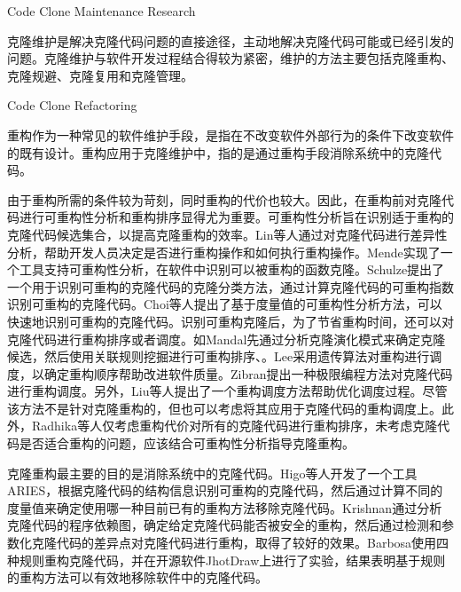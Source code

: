 {Code Clone Maintenance Research}

克隆维护是解决克隆代码问题的直接途径，主动地解决克隆代码可能或已经引发的问题。克隆维护与软件开发过程结合得较为紧密，维护的方法主要包括克隆重构、克隆规避、克隆复用和克隆管理。

{Code Clone Refactoring}

重构作为一种常见的软件维护手段，是指在不改变软件外部行为的条件下改变软件的既有设计\cite{kerievsky2006重构与模式}。重构应用于克隆维护中，指的是通过重构手段消除系统中的克隆代码。

由于重构所需的条件较为苛刻，同时重构的代价也较大。因此，在重构前对克隆代码进行可重构性分析和重构排序显得尤为重要。可重构性分析旨在识别适于重构的克隆代码候选集合，以提高克隆重构的效率。Lin等人通过对克隆代码进行差异性分析，帮助开发人员决定是否进行重构操作和如何执行重构操作\cite{lin2014detecting}。Mende实现了一个工具支持可重构性分析，在软件中识别可以被重构的函数克隆\cite{mende2009evaluation}。Schulze提出了一个用于识别可重构的克隆代码的克隆分类方法，通过计算克隆代码的可重构指数识别可重构的克隆代码\cite{schulze2008towards}。Choi等人提出了基于度量值的可重构性分析方法，可以快速地识别可重构的克隆代码\cite{choi2011extracting}。识别可重构克隆后，为了节省重构时间，还可以对克隆代码进行重构排序或者调度。如Mandal先通过分析克隆演化模式来确定克隆候选，然后使用关联规则挖掘进行可重构排序、\cite{mandal2014automatic}。Lee采用遗传算法对重构进行调度，以确定重构顺序帮助改进软件质量\cite{lee2011automated}。Zibran提出一种极限编程方法对克隆代码进行重构调度\cite{zibran2011constraint}。另外，Liu等人提出了一个重构调度方法帮助优化调度过程\cite{liu2012schedule}。尽管该方法不是针对克隆重构的，但也可以考虑将其应用于克隆代码的重构调度上。此外，Radhika等人仅考虑重构代价对所有的克隆代码进行重构排序，未考虑克隆代码是否适合重构的问题\cite{venkatasubramanyam2013prioritizing}，应该结合可重构性分析指导克隆重构。

克隆重构最主要的目的是消除系统中的克隆代码。Higo等人开发了一个工具ARIES，根据克隆代码的结构信息识别可重构的克隆代码，然后通过计算不同的度量值来确定使用哪一种目前已有的重构方法移除克隆代码\cite{higo2008metric}。Krishnan通过分析克隆代码的程序依赖图，确定给定克隆代码能否被安全的重构，然后通过检测和参数化克隆代码的差异点对克隆代码进行重构，取得了较好的效果\cite{krishnan2014unification}。Barbosa使用四种规则重构克隆代码，并在开源软件JhotDraw上进行了实验，结果表明基于规则的重构方法可以有效地移除软件中的克隆代码\cite{barbosa2013removing}。

